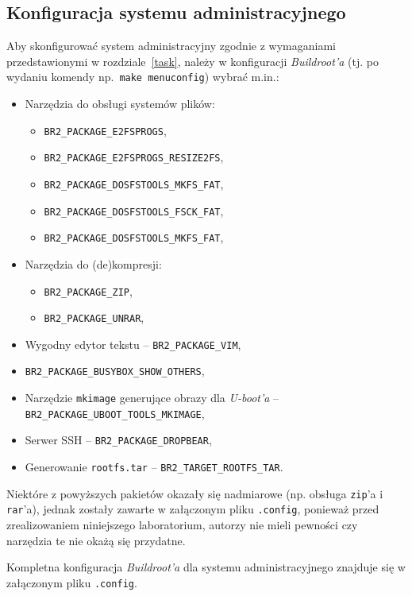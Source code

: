 \documentclass{article}
\begin{document}

\subsection{Konfiguracja systemu administracyjnego}

Aby skonfigurować system administracyjny zgodnie z wymaganiami przedstawionymi w rozdziale~\ref{task}, należy w konfiguracji \emph{Buildroot'a} (tj. po wydaniu komendy np.~\texttt{make menuconfig}) wybrać m.in.:
\begin{itemize}
	\item Narzędzia do obsługi systemów plików:
	\begin{itemize}
		\item \texttt{BR2\_PACKAGE\_E2FSPROGS},
		\item \texttt{BR2\_PACKAGE\_E2FSPROGS\_RESIZE2FS},
		\item \texttt{BR2\_PACKAGE\_DOSFSTOOLS\_MKFS\_FAT},
		\item \texttt{BR2\_PACKAGE\_DOSFSTOOLS\_FSCK\_FAT},
		\item \texttt{BR2\_PACKAGE\_DOSFSTOOLS\_MKFS\_FAT},
	\end{itemize}
	\item Narzędzia do (de)kompresji:
	\begin{itemize}
		\item \texttt{BR2\_PACKAGE\_ZIP},
		\item \texttt{BR2\_PACKAGE\_UNRAR},
	\end{itemize}
	\item Wygodny edytor tekstu -- \texttt{BR2\_PACKAGE\_VIM},
	\item \texttt{BR2\_PACKAGE\_BUSYBOX\_SHOW\_OTHERS},
	\item Narzędzie \texttt{mkimage} generujące obrazy dla \emph{U-boot'a} -- \texttt{BR2\_PACKAGE\_UBOOT\_TOOLS\_MKIMAGE},
	\item Serwer SSH -- \texttt{BR2\_PACKAGE\_DROPBEAR},
	\item Generowanie \texttt{rootfs.tar} -- \texttt{BR2\_TARGET\_ROOTFS\_TAR}.
\end{itemize}
Niektóre z powyższych pakietów okazały się nadmiarowe (np. obsługa \texttt{zip}'a i \texttt{rar}'a), jednak zostały zawarte w załączonym pliku \texttt{.config}, ponieważ przed zrealizowaniem niniejszego laboratorium, autorzy nie mieli pewności czy narzędzia te nie okażą się przydatne.

Kompletna konfiguracja \emph{Buildroot'a} dla systemu administracyjnego znajduje się w załączonym pliku \texttt{.config}.
\end{document}

